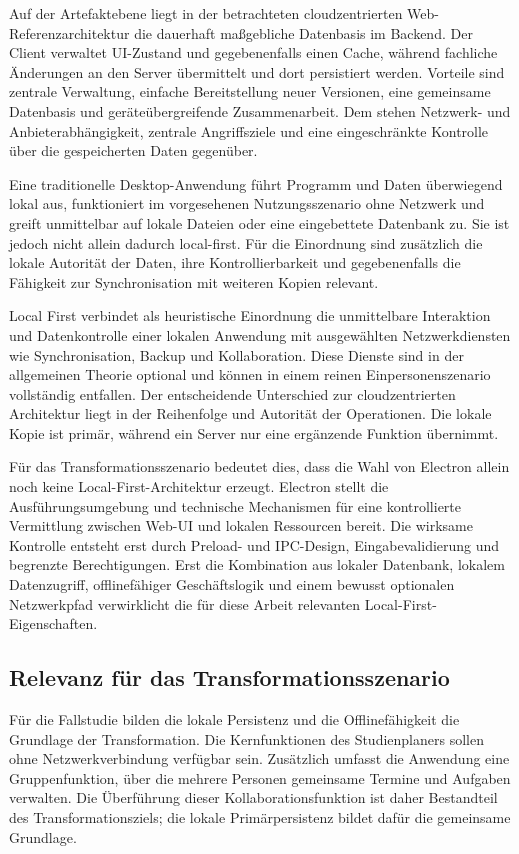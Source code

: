 Auf der Artefaktebene liegt in der betrachteten cloudzentrierten Web-Referenzarchitektur die dauerhaft maßgebliche Datenbasis im Backend.
Der Client verwaltet UI-Zustand und gegebenenfalls einen Cache, während fachliche Änderungen an den Server übermittelt und dort persistiert werden.
Vorteile sind zentrale Verwaltung, einfache Bereitstellung neuer Versionen, eine gemeinsame Datenbasis und geräteübergreifende Zusammenarbeit.
Dem stehen Netzwerk- und Anbieterabhängigkeit, zentrale Angriffsziele und eine eingeschränkte Kontrolle über die gespeicherten Daten gegenüber.

Eine traditionelle Desktop-Anwendung führt Programm und Daten überwiegend lokal aus, funktioniert im vorgesehenen Nutzungsszenario ohne Netzwerk und greift unmittelbar auf lokale Dateien oder eine eingebettete Datenbank zu.
Sie ist jedoch nicht allein dadurch local-first.
Für die Einordnung sind zusätzlich die lokale Autorität der Daten, ihre Kontrollierbarkeit und gegebenenfalls die Fähigkeit zur Synchronisation mit weiteren Kopien relevant.

Local First verbindet als heuristische Einordnung die unmittelbare Interaktion und Datenkontrolle einer lokalen Anwendung mit ausgewählten Netzwerkdiensten wie Synchronisation, Backup und Kollaboration.
Diese Dienste sind in der allgemeinen Theorie optional und können in einem reinen Einpersonenszenario vollständig entfallen.
Der entscheidende Unterschied zur cloudzentrierten Architektur liegt in der Reihenfolge und Autorität der Operationen.
Die lokale Kopie ist primär, während ein Server nur eine ergänzende Funktion übernimmt.

Für das Transformationsszenario bedeutet dies, dass die Wahl von Electron allein noch keine Local-First-Architektur erzeugt.
Electron stellt die Ausführungsumgebung und technische Mechanismen für eine kontrollierte Vermittlung zwischen Web-UI und lokalen Ressourcen bereit.
Die wirksame Kontrolle entsteht erst durch Preload- und IPC-Design, Eingabevalidierung und begrenzte Berechtigungen.
Erst die Kombination aus lokaler Datenbank, lokalem Datenzugriff, offlinefähiger Geschäftslogik und einem bewusst optionalen Netzwerkpfad verwirklicht die für diese Arbeit relevanten Local-First-Eigenschaften.
\subsection{Relevanz für das Transformationsszenario}
\label{sec:relevanz-local-first}
Für die Fallstudie bilden die lokale Persistenz und die Offlinefähigkeit die Grundlage der Transformation.
Die Kernfunktionen des Studienplaners sollen ohne Netzwerkverbindung verfügbar sein.
Zusätzlich umfasst die Anwendung eine Gruppenfunktion, über die mehrere Personen gemeinsame Termine und Aufgaben verwalten.
Die Überführung dieser Kollaborationsfunktion ist daher Bestandteil des Transformationsziels; die lokale Primärpersistenz bildet dafür die gemeinsame Grundlage.

